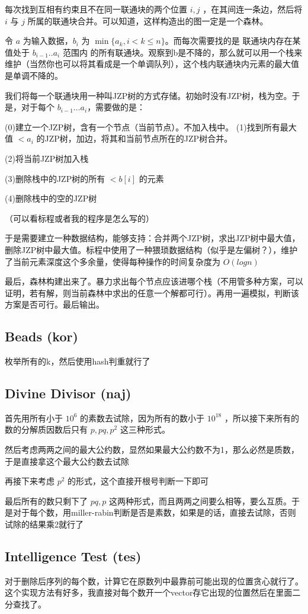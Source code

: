 \documentclass[a4paper,11pt]{article}
\begin{document}
每次找到互相有约束且不在同一联通块的两个位置 $i,j$ ，在其间连一条边，然后将 $i$ 与 $j$ 所属的联通块合并。可以知道，这样构造出的图一定是一个森林。

令 $a$ 为输入数据，$b_i$ 为 $\min\{a_k,i<k\le n\}$。而每次需要找的是 联通块内存在某值处于 $b_{i-1}..a_i$ 范围内 的所有联通块。观察到b是不降的，那么就可以用一个栈来维护（当然你也可以将其看成是一个单调队列），这个栈内联通块内元素的最大值是单调不降的。

我们将每一个联通块用一种叫JZP树的方式存储。初始时没有JZP树，栈为空。于是，对于每个 $b_{i-1}\dots a_i$，需要做的是：

(0)建立一个JZP树，含有一个节点（当前节点）。不加入栈中。
(1)找到所有最大值 $<a_i$ 的JZP树，加边，将其和当前节点所在的JZP树合并。

(2)将当前JZP树加入栈

(3)删除栈中的JZP树的所有 $<b[i]$ 的元素

(4)删除栈中的空的JZP树

（可以看标程或者我的程序是怎么写的）

于是需要建立一种数据结构，能够支持：合并两个JZP树，求出JZP树中最大值，删除JZP树中最大值。标程中使用了一种猥琐数据结构（似乎是左偏树？），维护了当前元素深度这个多余量，使得每种操作的时间复杂度为 $O(logn)$ 

最后，森林构建出来了。暴力求出每个节点应该进哪个栈（不用管多种方案，可以证明，若有解，则当前森林中求出的任意一个解都可行）。再用一遍模拟，判断该方案是否可行。最后输出。
\subsection*{Beads (kor)}
枚举所有的k，然后使用hash判重就行了
\subsection*{Divine Divisor (naj)}
首先用所有小于 $10^6$ 的素数去试除，因为所有的数小于 $10^{18}$ ，所以接下来所有的数的分解质因数后只有 $p, pq, p^2$ 这三种形式。

然后考虑两两之间的最大公约数，显然如果最大公约数不为1，那么必然是质数，于是直接拿这个最大公约数去试除

再接下来考虑 $p^2$ 的形式，这个直接开根号判断一下即可

最后所有的数只剩下了 $pq, p$ 这两种形式，而且两两之间要么相等，要么互质。于是对于每个数，用miller-rabin判断是否是素数，如果是的话，直接去试除，否则试除的结果乘2就行了

\subsection*{Intelligence Test (tes)}
对于删除后序列的每个数，计算它在原数列中最靠前可能出现的位置贪心就行了。这个实现方法有好多，我直接对每个数开一个vector存它出现的位置然后在里面二分查找了。
\end{document}
